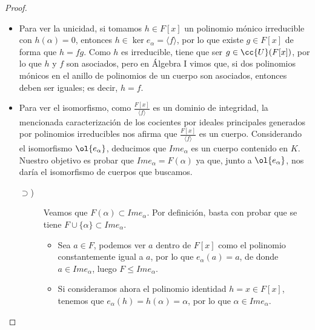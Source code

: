 \begin{prop}
\begin{proof}
\begin{itemize}
\begin{equation*}
                \end{equation*}
                dado por:
                donde $Im e_{\alpha}$ será un subanillo de $K$, que es un dominio de integridad por ser subconjunto de $K$ (un cuerpo, luego dominio de integridad). Se deduce, por tanto, que $\frac{F[x]}{\langle f \rangle }$ es un dominio de integridad, luego por la caracterización de los cocientes por ideales principales generados por polinomios irreducibles\footnote{Visto en Álgebra I.}, $f$ es irreducible.
            \item Para ver la unicidad, si tomamos $h\in F[x]$ un polinomio mónico irreducible con $h(\alpha)=0$, entonces $h\in \ker e_\alpha = \langle f \rangle $, por lo que existe $g\in F[x]$ de forma que $h = fg$. Como $h$ es irreducible, tiene que ser $g\in \cc{U}(F[x])$, por lo que $h$ y $f$ son asociados, pero en Álgebra I vimos que, si dos polinomios mónicos en el anillo de polinomios de un cuerpo son asociados, entonces deben ser iguales; es decir, $h = f$.
            \item Para ver el isomorfismo, como $\frac{F[x]}{\langle f \rangle }$ es un dominio de integridad, la mencionada caracterización de los cocientes por ideales principales generados por polinomios irreducibles nos afirma que $\frac{F[x]}{\langle f \rangle }$ es un cuerpo. Considerando el isomorfismo $\ol{e_\alpha}$, deducimos que $Im e_\alpha$ es un cuerpo contenido en $K$. Nuestro objetivo es probar que $Im e_\alpha = F(\alpha)$ ya que, junto a $\ol{e_\alpha}$, nos daría el isomorfismo de cuerpos que buscamos.
            \begin{description}
                \item[$\supset$)] Veamos que $F(\alpha)\subset Im e_{\alpha}$. Por definición, basta con probar que se tiene $F\cup \{\alpha\}\subset Im e_{\alpha}$.
                \begin{itemize}
                    \item Sea $a\in F$, podemos ver $a$ dentro de $F[x]$ como el polinomio constantemente igual a $a$, por lo que $e_\alpha(a) = a$, de donde $a\in Im e_\alpha$, luego $F\leq Im e_\alpha$.
                    \item Si consideramos ahora el polinomio identidad $h=x\in F[x]$, tenemos que $e_\alpha(h) = h(\alpha) = \alpha$, por lo que $\alpha\in Im e_\alpha$.
                \end{itemize}


\end{description}
\end{itemize}
\end{proof}
\end{prop}
